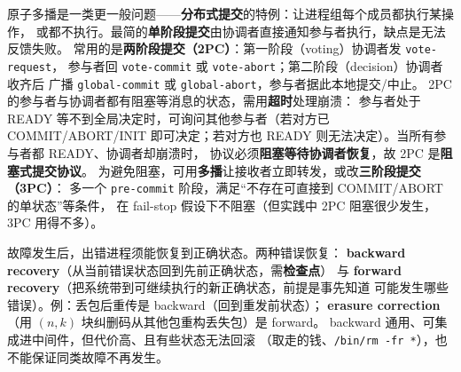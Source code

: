 \begin{closeread}
\end{closeread}



原子多播是一类更一般问题——\textbf{分布式提交}的特例：让进程组每个成员都执行某操作，
或都不执行。最简的\textbf{单阶段提交}由协调者直接通知参与者执行，缺点是无法反馈失败。
常用的是\textbf{两阶段提交（2PC）}：第一阶段（voting）协调者发 \texttt{vote-request}，
参与者回 \texttt{vote-commit} 或 \texttt{vote-abort}；第二阶段（decision）协调者收齐后
广播 \texttt{global-commit} 或 \texttt{global-abort}，参与者据此本地提交/中止。
2PC 的参与者与协调者都有阻塞等消息的状态，需用\textbf{超时}处理崩溃：
参与者处于 READY 等不到全局决定时，可询问其他参与者（若对方已 COMMIT/ABORT/INIT
即可决定；若对方也 READY 则无法决定）。当所有参与者都 READY、协调者却崩溃时，
协议必须\textbf{阻塞等待协调者恢复}，故 2PC 是\textbf{阻塞式提交协议}。
为避免阻塞，可用\textbf{多播}让接收者立即转发，或改\textbf{三阶段提交（3PC）}：
多一个 \texttt{pre-commit} 阶段，满足“不存在可直接到 COMMIT/ABORT 的单状态”等条件，
在 fail-stop 假设下不阻塞（但实践中 2PC 阻塞很少发生，3PC 用得不多）。

\begin{closeread}
\end{closeread}



故障发生后，出错进程须能恢复到正确状态。两种错误恢复：
\textbf{backward recovery}（从当前错误状态回到先前正确状态，需\textbf{检查点}）
与 \textbf{forward recovery}（把系统带到可继续执行的新正确状态，前提是事先知道
可能发生哪些错误）。例：丢包后重传是 backward（回到重发前状态）；
\textbf{erasure correction}（用 $(n,k)$ 块纠删码从其他包重构丢失包）是 forward。
backward 通用、可集成进中间件，但代价高、且有些状态无法回滚
（取走的钱、\texttt{/bin/rm -fr *}），也不能保证同类故障不再发生。

